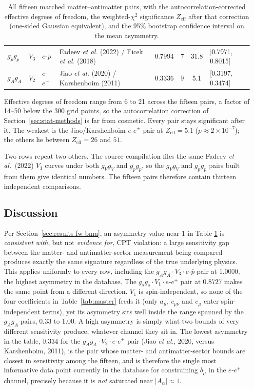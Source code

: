 \begin{table}[p]
\begin{tabular}{@{}l l l >{\raggedright\arraybackslash}p{3.4cm} r r c l@{}}
$g_pg_p$    & $V_3$    & $e$-$\bar p$ & Fadeev \textit{et al.} (2022) / Ficek \textit{et al.} (2018) & 0.7994 & 7  & 31.8 & [0.7971, 0.8015] \\
$g_Ag_A$    & $V_2$    & $e$-$e^+$    & Jiao \textit{et al.} (2020) / Karshenboim (2011) & 0.3336 & 9  & 5.1 & [0.3197, 0.3474] \\
\bottomrule
\end{tabular}
\caption[The fifteen matched matter--antimatter pairs]{All fifteen matched matter--antimatter pairs, with the
autocorrelation-corrected effective degrees of freedom, the weighted-$\chi^2$
significance $Z_{\text{eff}}$ after that correction (one-sided Gaussian
equivalent), and the 95\% bootstrap confidence interval on the mean
asymmetry.}
\label{tab:pairs}
\end{table}

Effective degrees of freedom range from 6 to 21 across the fifteen pairs, a
factor of 14--50 below the 300 grid points, so the autocorrelation
correction of Section~\ref{sec:stat-methods} is far from cosmetic. Every
pair stays significant after it. The weakest is the Jiao/Karshenboim
$e$-$e^+$ pair at $Z_{\text{eff}}=5.1$ ($p\approx2\times10^{-7}$); the
others lie between $Z_{\text{eff}}=26$ and $51$.

Two rows repeat two others. The source compilation files the same Fadeev
\textit{et al.}\ (2022) $V_3$ curves under both $g_Vg_V$ and $g_pg_p$, so
the $g_Vg_V$ and $g_pg_p$ pairs built from them give identical numbers. The
fifteen pairs therefore contain thirteen independent comparisons.

\subsection{Discussion}

Per Section~\ref{sec:results-fw-bmu}, an asymmetry value near 1 in Table
\ref{tab:pairs} is \emph{consistent with}, but not \emph{evidence for}, CPT
violation: a large sensitivity gap between the matter- and
antimatter-sector measurement being compared produces exactly the same
signature regardless of the true underlying physics. This applies
uniformly to every row, including the $g_Ag_A\cdot V_3\cdot e$-$\bar p$
pair at $1.0000$, the highest asymmetry in the database. The
$g_sg_s\cdot V_1\cdot e$-$e^+$ pair at $0.8727$ makes the same point from a
different direction. $V_1$ is spin-independent, so none of the four
coefficients in Table~\ref{tab:master} feeds it (only $a_\mu$, $c_{\mu\nu}$
and $e_\mu$ enter spin-independent terms), yet its asymmetry sits well
inside the range spanned by the $g_Ag_A$ pairs, 0.33 to 1.00. A high
asymmetry is simply what two bounds of very different sensitivity produce,
whatever channel they sit in. The lowest asymmetry in
the table, $0.334$ for the $g_Ag_A\cdot V_2\cdot e$-$e^+$ pair (Jiao
\textit{et al.}, 2020, versus Karshenboim, 2011), is the pair whose
matter- and antimatter-sector bounds are closest in sensitivity among the
fifteen, and is therefore the single most informative data point currently
in the database for constraining $b_\mu$ in the $e$-$e^+$ channel, precisely
because it is \emph{not} saturated near $|A_\alpha|\approx1$.

